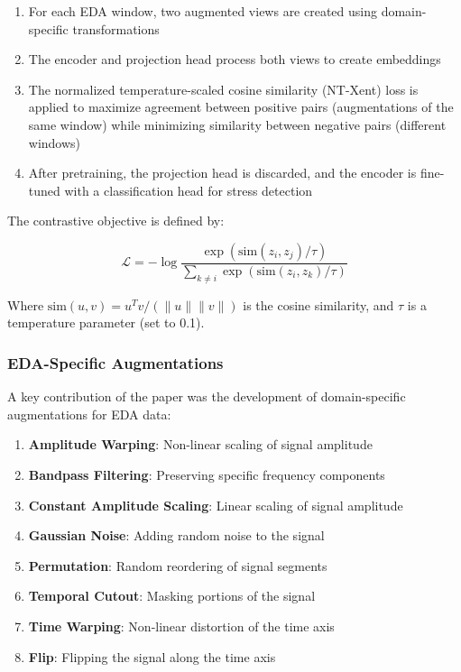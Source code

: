 \documentclass[10pt,letterpaper,twocolumn]{article}
\begin{document}
\begin{enumerate}
    \item For each EDA window, two augmented views are created using domain-specific transformations
    \item The encoder and projection head process both views to create embeddings
    \item The normalized temperature-scaled cosine similarity (NT-Xent) loss is applied to maximize agreement between positive pairs (augmentations of the same window) while minimizing similarity between negative pairs (different windows)
    \item After pretraining, the projection head is discarded, and the encoder is fine-tuned with a classification head for stress detection
\end{enumerate}

The contrastive objective is defined by:

$$\mathcal{L} = -\log \frac{\exp(\text{sim}(z_i, z_j) / \tau)}{\sum_{k \neq i} \exp(\text{sim}(z_i, z_k) / \tau)}$$

Where $\text{sim}(u, v) = u^T v / (\|u\| \|v\|)$ is the cosine similarity, and $\tau$ is a temperature parameter (set to 0.1).

\subsubsection{EDA-Specific Augmentations}

A key contribution of the paper was the development of domain-specific augmentations for EDA data:

\begin{enumerate}
    \item \textbf{Amplitude Warping}: Non-linear scaling of signal amplitude
    \item \textbf{Bandpass Filtering}: Preserving specific frequency components
    \item \textbf{Constant Amplitude Scaling}: Linear scaling of signal amplitude
    \item \textbf{Gaussian Noise}: Adding random noise to the signal
    \item \textbf{Permutation}: Random reordering of signal segments
    \item \textbf{Temporal Cutout}: Masking portions of the signal
    \item \textbf{Time Warping}: Non-linear distortion of the time axis
    \item \textbf{Flip}: Flipping the signal along the time axis
\end{enumerate}
\end{document}

